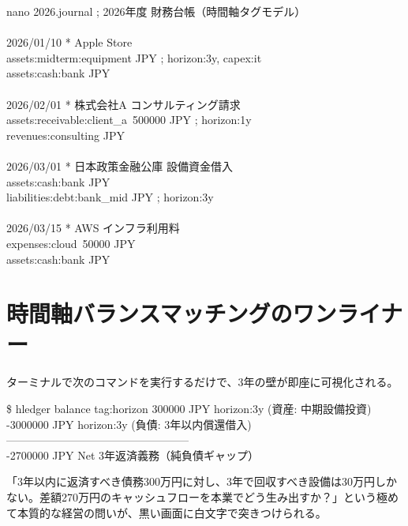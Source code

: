 \documentclass[11pt, a4paper]{report}
\begin{document}
\begin{terminalbox}{nano 2026.journal}
; 2026年度 財務台帳（時間軸タグモデル）\\
\\
2026/01/10 * Apple Store\\
\quad assets:midterm:equipment JPY \quad ; horizon:3y, capex:it\\
\quad assets:cash:bank\qquad\qquad{} JPY\\
\\
2026/02/01 * 株式会社A コンサルティング請求\\
\quad assets:receivable:client\_a\quad\ 500000 JPY \quad ; horizon:1y\\
\quad revenues:consulting\qquad{} JPY\\
\\
2026/03/01 * 日本政策金融公庫 設備資金借入\\
\quad assets:cash:bank\qquad\qquad{} JPY\\
\quad liabilities:debt:bank\_mid JPY \quad ; horizon:3y\\
\\
2026/03/15 * AWS インフラ利用料\\
\quad expenses:cloud\qquad\qquad\quad\ 50000 JPY\\
\quad assets:cash:bank\qquad\qquad{} JPY
\end{terminalbox}

\section{時間軸バランスマッチングのワンライナー}

ターミナルで次のコマンドを実行するだけで、3年の壁が即座に可視化される。

\begin{terminalbox}{\$ hledger balance tag:horizon}
\phantom{-}300000 JPY \quad horizon:3y (資産: 中期設備投資)\\
-3000000 JPY \quad horizon:3y (負債: 3年以内償還借入)\\
--------------------------------------------------\\
-2700000 JPY \quad Net 3年返済義務（純負債ギャップ）
\end{terminalbox}

「3年以内に返済すべき債務300万円に対し、3年で回収すべき設備は30万円しかない。差額270万円のキャッシュフローを本業でどう生み出すか？」という極めて本質的な経営の問いが、黒い画面に白文字で突きつけられる。
\end{document}
